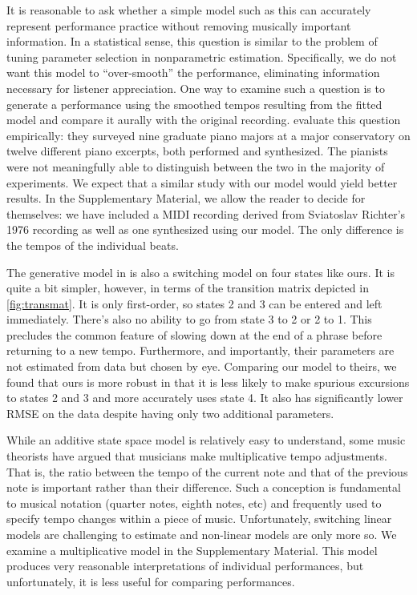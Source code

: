 \documentclass[aoas]{imsart}
\begin{document}
It is reasonable to ask whether a simple model such as this can
accurately represent performance practice without removing musically important
information. In a statistical sense, this question is similar to the
problem of tuning parameter selection in nonparametric
estimation. Specifically, we do not want this model to
``over-smooth'' the performance, eliminating information necessary for
listener appreciation. One way to examine such a question 
is to generate a performance using the smoothed tempos resulting from
the fitted model and compare it aurally with the original recording.
\citet{GuRaphael2012} evaluate this question empirically: they surveyed nine graduate piano majors at a
major conservatory on twelve different piano excerpts, both performed
and synthesized. The pianists
were not meaningfully able to distinguish between the two in the
majority of experiments. We expect that a similar
study with our model would yield better results. In the Supplementary
Material, we allow the reader to decide for themselves: we have
included a MIDI recording derived from Sviatoslav Richter's 1976
recording as well as one synthesized using our model. The only
difference is the tempos of the individual beats.

The generative model in \citet{GuRaphael2012} is also a switching
model on four states like ours. It is quite a bit simpler, however, in terms of
the transition matrix depicted in \autoref{fig:transmat}. It is only first-order, so states 2 and 3 can
be entered and left immediately. There's also no ability to go from
state 3 to 2 or 2 to 1. This precludes the common feature of
slowing down at the end of a phrase before returning to a new tempo. Furthermore, and importantly, their parameters are not
estimated from data but chosen by eye. Comparing our model to theirs, we found that
ours is more robust in that it is less likely to make spurious
excursions to states 2 and 3 and more accurately uses state 4. It also
has significantly lower RMSE on the data despite having only two
additional parameters. 

While an additive state space model is relatively easy to understand,
some music theorists \citep[for example]{Mead2007} have argued that
musicians make multiplicative tempo adjustments. That is, the ratio
between the tempo of the current note and that of the previous note is
important rather than their difference. Such a conception is
fundamental to musical notation (quarter notes, eighth notes, etc) and
frequently used to specify tempo changes within a piece of
music. Unfortunately, switching linear models are challenging to
estimate and non-linear models are only more so. We examine a
multiplicative model in the Supplementary Material. This model produces
very reasonable interpretations of individual performances, but
unfortunately, it is less
useful for comparing performances.  
\end{document}
